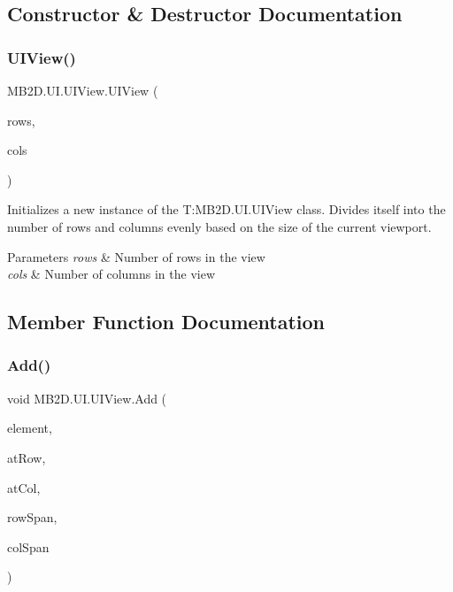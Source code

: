 \subsection{Constructor \& Destructor Documentation}
\hypertarget{class_m_b2_d_1_1_u_i_1_1_u_i_view_ad441dede0fc04e04b4137395eaeab376}{}\label{class_m_b2_d_1_1_u_i_1_1_u_i_view_ad441dede0fc04e04b4137395eaeab376} 
\subsubsection{\texorpdfstring{U\+I\+View()}{UIView()}}
{\footnotesize\ttfamily M\+B2\+D.\+U\+I.\+U\+I\+View.\+U\+I\+View (\begin{DoxyParamCaption}\item[{int}]{rows,  }\item[{int}]{cols }\end{DoxyParamCaption})\hspace{0.3cm}{\ttfamily [inline]}}



Initializes a new instance of the T\+:\+M\+B2\+D.\+U\+I.\+U\+I\+View class. Divides itself into the number of rows and columns evenly based on the size of the current viewport. 


\begin{DoxyParams}{Parameters}
{\em rows} & Number of rows in the view\\
\hline
{\em cols} & Number of columns in the view\\
\hline
\end{DoxyParams}


\subsection{Member Function Documentation}
\hypertarget{class_m_b2_d_1_1_u_i_1_1_u_i_view_a486357124c0a1bc13d1c5909f26a6e2b}{}\label{class_m_b2_d_1_1_u_i_1_1_u_i_view_a486357124c0a1bc13d1c5909f26a6e2b} 
\subsubsection{\texorpdfstring{Add()}{Add()}}
{\footnotesize\ttfamily void M\+B2\+D.\+U\+I.\+U\+I\+View.\+Add (\begin{DoxyParamCaption}\item[{\hyperlink{class_m_b2_d_1_1_u_i_1_1_u_i_element}{U\+I\+Element}}]{element,  }\item[{int}]{at\+Row,  }\item[{int}]{at\+Col,  }\item[{int}]{row\+Span,  }\item[{int}]{col\+Span }\end{DoxyParamCaption})\hspace{0.3cm}{\ttfamily [inline]}}



